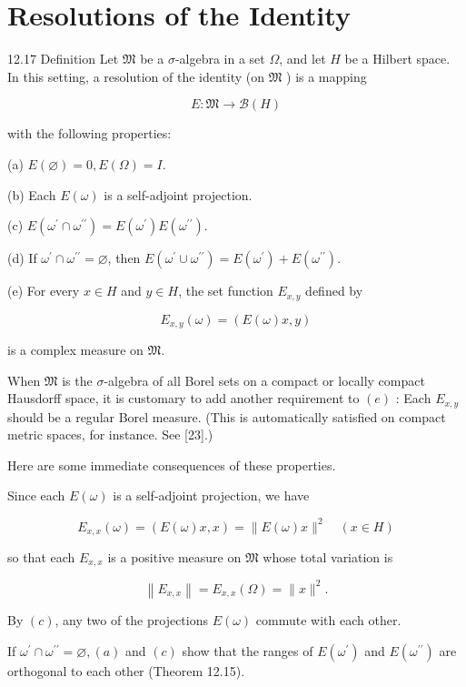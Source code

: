 \documentclass[10pt]{article}
\begin{document}
\section{Resolutions of the Identity}
12.17 Definition Let $\mathfrak{M}$ be a $\sigma$-algebra in a set $\Omega$, and let $H$ be a Hilbert space. In this setting, a resolution of the identity (on $\mathfrak{M}$ ) is a mapping

$$
E: \mathfrak{M} \rightarrow \mathscr{B}(H)
$$

with the following properties:

(a) $E(\varnothing)=0, E(\Omega)=I$.

(b) Each $E(\omega)$ is a self-adjoint projection.

(c) $E\left(\omega^{\prime} \cap \omega^{\prime \prime}\right)=E\left(\omega^{\prime}\right) E\left(\omega^{\prime \prime}\right)$.

(d) If $\omega^{\prime} \cap \omega^{\prime \prime}=\varnothing$, then $E\left(\omega^{\prime} \cup \omega^{\prime \prime}\right)=E\left(\omega^{\prime}\right)+E\left(\omega^{\prime \prime}\right)$.

(e) For every $x \in H$ and $y \in H$, the set function $E_{x, y}$ defined by

$$
E_{x, y}(\omega)=(E(\omega) x, y)
$$

is a complex measure on $\mathfrak{M}$.

When $\mathfrak{M}$ is the $\sigma$-algebra of all Borel sets on a compact or locally compact Hausdorff space, it is customary to add another requirement to $(e)$ : Each $E_{x, y}$ should be a regular Borel measure. (This is automatically satisfied on compact metric spaces, for instance. See [23].)

Here are some immediate consequences of these properties.

Since each $E(\omega)$ is a self-adjoint projection, we have

$$
E_{x, x}(\omega)=(E(\omega) x, x)=\|E(\omega) x\|^{2} \quad(x \in H)
$$

so that each $E_{x, x}$ is a positive measure on $\mathfrak{M}$ whose total variation is

$$
\left\|E_{x, x}\right\|=E_{x, x}(\Omega)=\|x\|^{2} .
$$

By $(c)$, any two of the projections $E(\omega)$ commute with each other.

If $\omega^{\prime} \cap \omega^{\prime \prime}=\varnothing,(a)$ and $(c)$ show that the ranges of $E\left(\omega^{\prime}\right)$ and $E\left(\omega^{\prime \prime}\right)$ are orthogonal to each other (Theorem 12.15).
\end{document}
